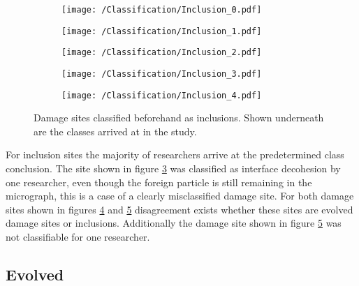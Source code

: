 \begin{figure}[H]
\begin{subfigure}{.2\textwidth}
\centering
  \texttt{[image: /Classification/Inclusion\_0.pdf]}
  \caption{}
  \label{fig:Inc1}
\end{subfigure}%
\begin{subfigure}{.2\textwidth}
\centering
  \texttt{[image: /Classification/Inclusion\_1.pdf]}
  \caption{}
  \label{fig:Inc2}
\end{subfigure}%
\centering
\begin{subfigure}{.2\textwidth}
\centering
  \texttt{[image: /Classification/Inclusion\_2.pdf]}
  \caption{}
  \label{fig:Inc3}
\end{subfigure}%
\begin{subfigure}{.2\textwidth}
\centering
  \texttt{[image: /Classification/Inclusion\_3.pdf]}
  \caption{}
  \label{fig:Inc4}
\end{subfigure}%
\begin{subfigure}{.2\textwidth}
\centering
  \texttt{[image: /Classification/Inclusion\_4.pdf]}
  \caption{}
  \label{fig:Inc5}
\end{subfigure}%
\caption{Damage sites classified beforehand as inclusions. Shown underneath are the classes arrived at in the study.}
\label{fig:classes}
\end{figure}

For inclusion sites the majority of researchers arrive at the predetermined class conclusion. The site shown in figure \ref{fig:Inc3} was classified as interface decohesion by one researcher, even though the foreign particle is still remaining in the micrograph, this is a case of a clearly misclassified damage site. For both damage sites shown in figures \ref{fig:Inc4} and \ref{fig:Inc5} disagreement exists whether these sites are evolved damage sites or inclusions. Additionally the damage site shown in figure \ref{fig:Inc5} was not classifiable for one researcher.



\subsection{Evolved}

